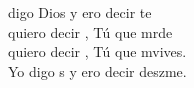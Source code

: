 \begin{cancion}%
	 digo Dios y ero decir te  \\
	quiero decir , Tú que mrde\\
	quiero decir , Tú que mvives.\\
	Yo digo s y ero decir deszme.\\
	  \\
\end{cancion}%
